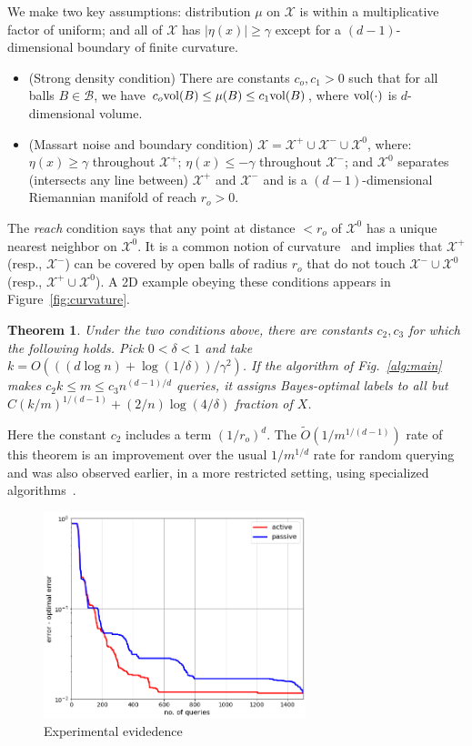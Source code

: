 \documentclass[twoside]{article}
\def\X{{\mathcal X}}
\def\B{{\mathcal B}}
\def\vol{{\rm vol}}
\newtheorem{thm}{Theorem}
\begin{document}
We make two key assumptions: distribution $\mu$ on $\X$ is within a multiplicative factor of uniform; and all of $\X$ has $|\eta(x)| \geq \gamma$ except for a $(d-1)$-dimensional boundary of finite curvature.
\begin{itemize}[leftmargin=0.5cm]
\item (Strong density condition)
There are constants $c_o, c_1 > 0$ such that for all balls $B \in \B$,
we have $c_o \vol(B) \leq \mu(B) \leq c_1 \vol(B) $, where $\vol(\cdot)$ is $d$-dimensional volume.
\item (Massart noise and boundary condition) $\X = \X^+ \cup \X^- \cup \X^0$, where: $\eta(x) \geq \gamma$ throughout $\X^+$; $\eta(x) \leq -\gamma$ throughout $\X^-$; and $\X^0$ separates (intersects any line between) $\X^+$ and $\X^-$ and is a $(d-1)$-dimensional Riemannian manifold of reach $r_o > 0$.
\end{itemize}
The \emph{reach} condition says that any point at distance $< r_o$ of $\X^0$ has a unique nearest neighbor on $\X^0$. It is a common notion of curvature~\cite{F59,NSW06} and implies that $\X^+$ (resp., $\X^-$) can be covered by open balls of radius $r_o$ that do not touch $\X^- \cup \X^0$ (resp., $\X^+ \cup \X^0$). A 2D example obeying these conditions appears in Figure~\ref{fig:curvature}.
\begin{thm}
  Under the two conditions above, there are constants $c_2, c_3$ for
  which the following holds. Pick $0 < \delta < 1$ and take
  $k = O(((d \log n) + \log (1/\delta))/\gamma^2)$. If the algorithm
  of Fig.~\ref{alg:main} makes $c_2k \leq m \leq c_3 n^{(d-1)/d}$
  queries, it assigns Bayes-optimal labels to all but
  $C (k/m)^{1/(d-1)} + (2/n) \log (4/\delta)$ fraction of $X$.
\label{thm:massart-dist}
\end{thm}

 Here the constant $c_2$ includes a term $(1/r_o)^d$. The
$\tilde{O}(1/m^{1/(d-1)})$ rate of this theorem is an improvement over
the usual $1/m^{1/d}$ rate for random querying and was also observed
earlier, in a more restricted setting, using specialized
algorithms~\cite{CN08}.

\begin{figure}
\begin{center}
\includegraphics[width=3in]{figures/MassartExperiment.png}
\end{center}
\caption{Experimental evidedence}
\label{fig:Experiments}
\end{figure}
\end{document}
